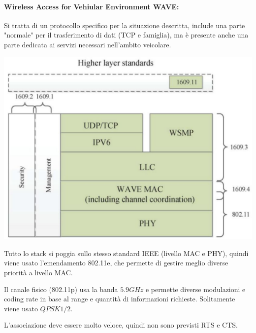 \paragraph{Wireless Access for Vehiular Environment WAVE:} Si tratta di un protocollo specifico per la situazione descritta, include una parte "normale" per il trasferimento di dati (TCP e famiglia), ma è presente anche una parte dedicata ai servizi necessari nell'ambito veicolare.
\begin{center}
	\includegraphics[width=0.6\linewidth]{img/wlan/wave}
\end{center}

Tutto lo stack si poggia sullo stesso standard IEEE (livello MAC e PHY), quindi viene usato l'emendamento 802.11e, che permette di gestire meglio diverse priorità a livello MAC.

Il canale fisico (802.11p) usa la banda $5.9GHz$ e permette diverse modulazioni e coding rate in base al range e quantità di informazioni richieste. Solitamente viene usato $QPSK 1/2$.

L'associazione deve essere molto veloce, quindi non sono previsti RTS e CTS.

